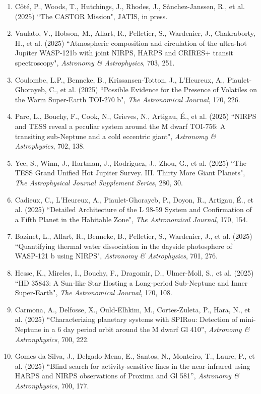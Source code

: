 \documentclass[12pt]{article}
\begin{document}
\begin{itemize}
\begin{enumerate}
\item C\^ot\'e, P., Woods, T., Hutchings, J., Rhodes, J., S\`anchez-Janssen, R., et al. (2025) ``The CASTOR Mission", JATIS, in press.
\item Vaulato, V., Hobson, M., Allart, R., Pelletier, S., Wardenier, J., Chakraborty, H., et al. (2025) ``Atmospheric composition and circulation of the ultra-hot Jupiter WASP-121b with joint NIRPS, HARPS and CRIRES+ transit spectroscopy", {\it Astronomy \& Astrophysics}, 703, 251.
\item Coulombe, L.P., Benneke, B., Krissansen-Totton, J., L'Heureux, A., Piaulet-Ghorayeb, C., et al. (2025) ``Possible Evidence for the Presence of Volatiles on the Warm Super-Earth TOI-270 b", {\it The Astronomical Journal}, 170, 226.
\item Parc, L., Bouchy, F., Cook, N., Grieves, N., Artigau, \'E., et al. (2025) ``NIRPS and TESS reveal a peculiar system around the M dwarf TOI-756: A transiting sub-Neptune and a cold eccentric giant", {\it Astronomy \& Astrophysics}, 702, 138.
\item Yee, S., Winn, J., Hartman, J., Rodriguez, J., Zhou, G., et al. (2025) ``The TESS Grand Unified Hot Jupiter Survey. III. Thirty More Giant Planets", {\it The Astrophysical Journal Supplement Series}, 280, 30.
\item Cadieux, C., L'Heureux, A., Piaulet-Ghorayeb, P., Doyon, R., Artigau, \'E., et al. (2025) ``Detailed Architecture of the L 98-59 System and Confirmation of a Fifth Planet in the Habitable Zone", {\it The Astronomical Journal}, 170, 154.
\item Bazinet, L., Allart, R., Benneke, B., Pelletier, S., Wardenier, J., et al. (2025) ``Quantifying thermal water dissociation in the dayside photosphere of WASP-121 b using NIRPS", {\it Astronomy \& Astrophysics}, 701, 276.
\item Hesse, K., Mireles, I., Bouchy, F., Dragomir, D., Ulmer-Moll, S., et al. (2025) ``HD 35843: A Sun-like Star Hosting a Long-period Sub-Neptune and Inner Super-Earth", {\it The Astronomical Journal}, 170, 108.
\item Carmona, A., Delfosse, X., Ould-Elhkim, M., Cortes-Zuleta, P., Hara, N., et al. (2025) ``Characterizing planetary systems with SPIRou: Detection of mini-Neptune in a 6 day period orbit around the M dwarf Gl 410'', {\it Astronomy \& Astronphysics}, 700, 222.
\item Gomes da Silva, J., Delgado-Mena, E., Santos, N., Monteiro, T., Laure, P., et al. (2025) ``Blind search for activity-sensitive lines in the near-infrared using HARPS and NIRPS observations of Proxima and Gl 581'', {\it Astronomy \& Astronphysics}, 700, 177.

\end{enumerate}
\end{itemize}
\end{document}

